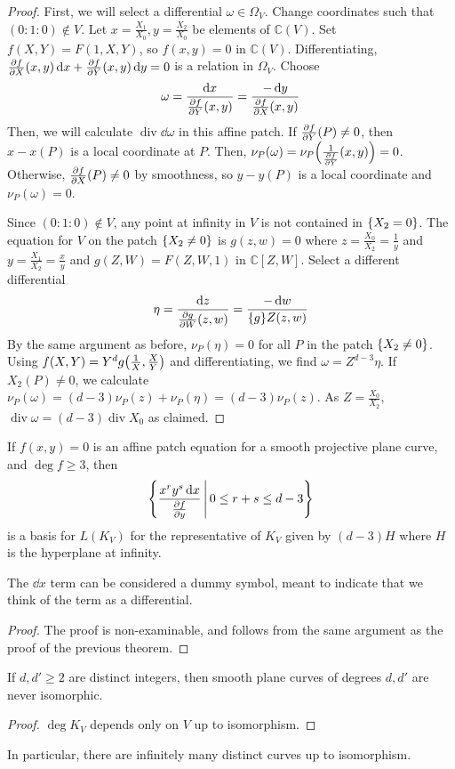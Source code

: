 \begin{proof}
    First, we will select a differential \( \omega \in \Omega_V \).
    Change coordinates such that \( (0 : 1 : 0) \not\in V \).
    Let \( x = \frac{X_1}{X_0}, y = \frac{X_2}{X_0} \) be elements of \( \mathbb C(V) \).
    Set \( f(X,Y) = F(1,X,Y) \), so \( f(x,y) = 0 \) in \( \mathbb C(V) \).
    Differentiating, \( \pdv{f}{X}\qty(x,y) \dd{x} + \pdv{f}{Y}\qty(x,y) \dd{y} = 0 \) is a relation in \( \Omega_V \).
    Choose
    \[ \omega = \frac{\dd{x}}{\pdv{f}{Y}\qty(x,y)} = \frac{-\dd{y}}{\pdv{f}{X}\qty(x,y)} \]
    Then, we will calculate \( \operatorname{div}\dd{\omega} \) in this affine patch.
    If \( \pdv{f}{Y}\qty(P) \neq 0 \), then \( x - x(P) \) is a local coordinate at \( P \).
    Then, \( \nu_P(\omega) = \nu_P\qty(\frac{1}{\pdv{f}{Y}}\qty(x,y)) = 0 \).
    Otherwise, \( \pdv{f}{X}\qty(P) \neq 0 \) by smoothness, so \( y - y(P) \) is a local coordinate and \( \nu_P(\omega) = 0 \).

    Since \( (0 : 1 : 0) \not\in V \), any point at infinity in \( V \) is not contained in \( \qty{X_2 = 0} \).
    The equation for \( V \) on the patch \( \qty{X_2 \neq 0} \) is \( g(z,w) = 0 \) where \( z = \frac{X_0}{X_2} = \frac{1}{y} \) and \( y = \frac{X_1}{X_2} = \frac{x}{y} \) and \( g(Z,W) = F(Z,W,1) \) in \( \mathbb C[Z,W] \).
    Select a different differential
    \[ \eta = \frac{\dd{z}}{\pdv{g}{W}\qty(z,w)} = \frac{-\dd{w}}{\qty{g}{Z}\qty(z,w)} \]
    By the same argument as before, \( \nu_P(\eta) = 0 \) for all \( P \) in the patch \( \qty{X_2 \neq 0} \).
    Using \( f(X,Y) = Y^d g\qty(\frac{1}{X}, \frac{X}{Y}) \) and differentiating, we find \( \omega = Z^{d-3} \eta \).
    If \( X_2(P) \neq 0 \), we calculate \( \nu_P(\omega) = (d-3)\nu_P(z) + \nu_P(\eta) = (d-3)\nu_P(z) \).
    As \( Z = \frac{X_0}{X_2} \), \( \operatorname{div} \omega = (d-3) \operatorname{div} X_0 \) as claimed.
\end{proof}
\begin{proposition}
    If \( f(x,y) = 0 \) is an affine patch equation for a smooth projective plane curve, and \( \deg f \geq 3 \), then
    \[ \qty{\frac{x^r y^s \dd{x}}{\pdv{f}{y}} \,\middle|\,0 \leq r + s \leq d - 3} \]
    is a basis for \( L(K_V) \) for the representative of \( K_V \) given by \( (d-3)H \) where \( H \) is the hyperplane at infinity.
\end{proposition}
The \( \dd{x} \) term can be considered a dummy symbol, meant to indicate that we think of the term as a differential.
\begin{proof}
    The proof is non-examinable, and follows from the same argument as the proof of the previous theorem.
\end{proof}
\begin{corollary}
    If \( d, d' \geq 2 \) are distinct integers, then smooth plane curves of degrees \( d, d' \) are never isomorphic.
\end{corollary}
\begin{proof}
    \( \deg K_V \) depends only on \( V \) up to isomorphism.
\end{proof}
In particular, there are infinitely many distinct curves up to isomorphism.

